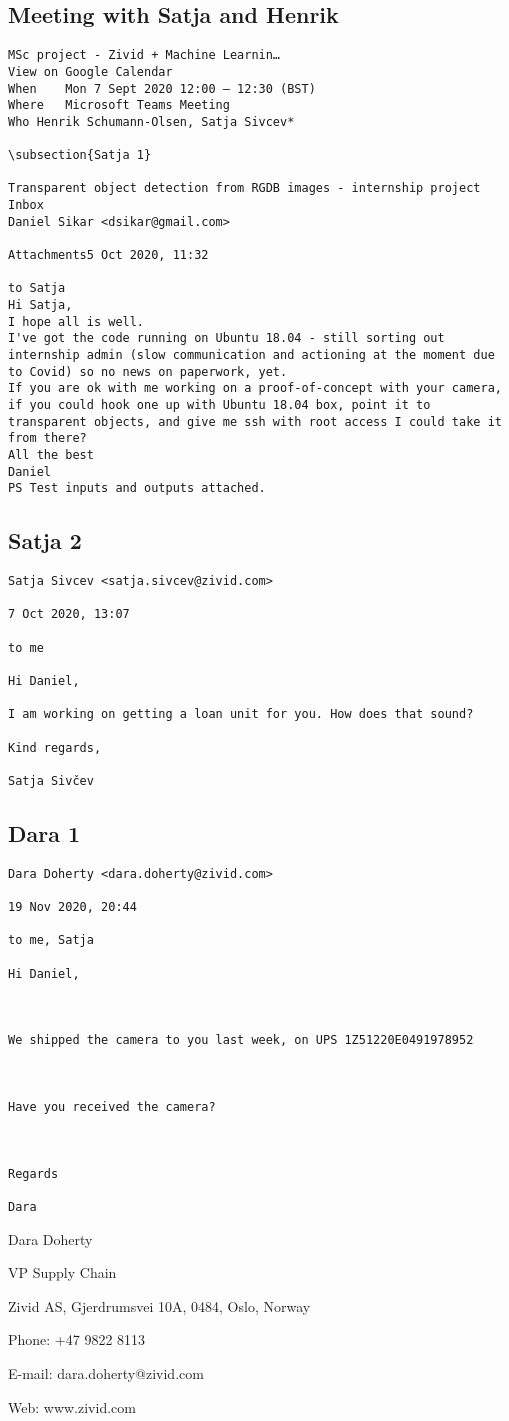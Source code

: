 \subsection{Meeting with Satja and Henrik}
\begin{verbatim}
MSc project - Zivid + Machine Learnin…
View on Google Calendar
When	Mon 7 Sept 2020 12:00 – 12:30 (BST)
Where	Microsoft Teams Meeting
Who	Henrik Schumann-Olsen, Satja Sivcev*

\subsection{Satja 1}

Transparent object detection from RGDB images - internship project
Inbox
Daniel Sikar <dsikar@gmail.com>
	
Attachments5 Oct 2020, 11:32
	
to Satja
Hi Satja,
I hope all is well.
I've got the code running on Ubuntu 18.04 - still sorting out
internship admin (slow communication and actioning at the moment due
to Covid) so no news on paperwork, yet.
If you are ok with me working on a proof-of-concept with your camera,
if you could hook one up with Ubuntu 18.04 box, point it to
transparent objects, and give me ssh with root access I could take it
from there?
All the best
Daniel
PS Test inputs and outputs attached.

\end{verbatim}
\subsection{Satja 2}
\begin{verbatim}
Satja Sivcev <satja.sivcev@zivid.com>
	
7 Oct 2020, 13:07
	
to me

Hi Daniel,

I am working on getting a loan unit for you. How does that sound?

Kind regards,

Satja Sivčev
\end{verbatim}

\subsection{Dara 1}
\begin{verbatim}
Dara Doherty <dara.doherty@zivid.com>
	
19 Nov 2020, 20:44
	
to me, Satja

Hi Daniel,

 

We shipped the camera to you last week, on UPS 1Z51220E0491978952

 

Have you received the camera?

 

Regards

Dara

\end{verbatim}

 

Dara Doherty

VP Supply Chain

Zivid AS, Gjerdrumsvei 10A, 0484, Oslo, Norway

Phone: +47 9822 8113

E-mail: dara.doherty@zivid.com

Web: www.zivid.com